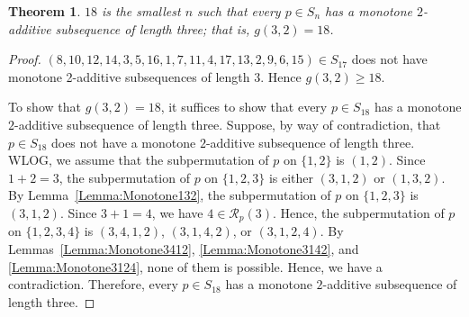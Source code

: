 \documentclass[11pt]{article}
\newtheorem{theorem}{Theorem}[section]
\theoremstyle{definition}
\begin{document}
\begin{theorem}\label{Theorem:Monotone2Additive}
    $18$ is the smallest $n$ such that every $p\in S_n$ has a monotone $2$-additive subsequence of length three; that is, $g(3,2)=18$.
\end{theorem}
\begin{proof}
$(8,10,12,14,3,5,16,1,7,11,4,17,13,2,9,6,15)\in S_{17}$ does not have monotone 2-additive subsequences of length 3. Hence $g(3,2)\geq18$.

To show that $g(3,2)=18$, it suffices to show that every $p\in S_{18}$ has a monotone $2$-additive subsequence of length three. Suppose, by way of contradiction, that $p\in S_{18}$ does not have a monotone $2$-additive subsequence of length three. WLOG, we assume that the subpermutation of $p$ on $\{1,2\}$ is $(1,2)$. Since $1+2=3$, the subpermutation of $p$ on $\{1,2,3\}$ is either $(3,1,2)$ or $(1,3,2)$. By Lemma~\ref{Lemma:Monotone132}, the subpermutation of $p$ on $\{1,2,3\}$ is $(3,1,2)$. Since $3+1=4$, we have $4\in\mathcal{R}_p(3)$. Hence, the subpermutation of $p$ on $\{1,2,3,4\}$ is $(3,4,1,2)$, $(3,1,4,2)$, or $(3,1,2,4)$. By Lemmas~\ref{Lemma:Monotone3412}, \ref{Lemma:Monotone3142}, and  \ref{Lemma:Monotone3124}, none of them is possible. Hence, we have a contradiction. Therefore, every $p\in S_{18}$ has a monotone $2$-additive subsequence of length three.
\end{proof}
\end{document}
